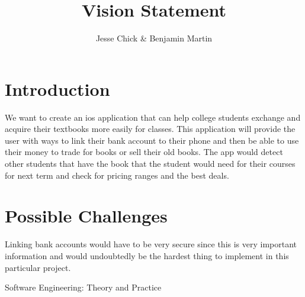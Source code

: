\documentclass[12pt]{article}
\title{Vision Statement}
\author{Jesse Chick & Benjamin Martin}
\begin{document}
\maketitle
\tableofcontents



\section{Introduction}
We want to create an ios application that can help college students exchange and acquire their textbooks more easily for classes. This application will provide the user with ways to link their bank account to their phone and then be able to use their money to trade for books or sell their old books. The app would detect other students that have the book that the student would need for their courses for next term and check for pricing ranges and the best deals.

\section{Possible Challenges}

Linking bank accounts would have to be very secure since this is very important information and would undoubtedly be the hardest thing to implement in this particular project.


Software Engineering: Theory and Practice~\cite{bookhuff}





\end{document}
